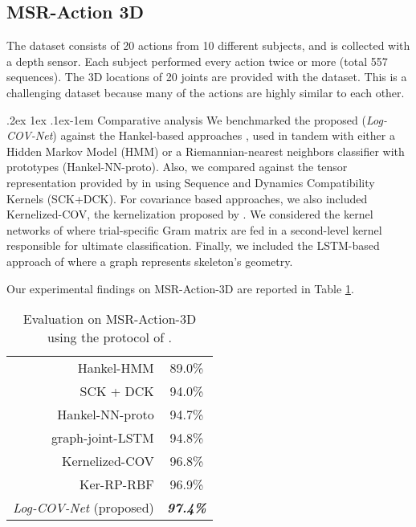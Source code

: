 \documentclass[10pt,twocolumn]{article}
\makeatletter
\renewcommand{\paragraph}{%
	\@startsection{paragraph}{4}%
	{\z@}{.2ex \@plus 1ex \@minus .1ex}{-1em}%
	{\normalfont\normalsize\bfseries}%
}
\makeatother
\begin{document}
\subsection{MSR-Action 3D} The dataset consists of 20 actions
from 10 different subjects, and is collected with a depth sensor. Each subject performed every action twice or more (total 557 sequences). The 3D locations of 20 joints are provided with the dataset. This is a challenging dataset because many of the actions are highly similar to each other.

\paragraph{Comparative analysis} We benchmarked the proposed (\textit{Log-COV-Net}) against the Hankel-based approaches \cite{Camps:ACCV14,Camps:CVPR16}, used in tandem with either a Hidden Markov Model (HMM) or a Riemannian-nearest neighbors classifier with prototypes (Hankel-NN-proto). Also, we compared against the tensor representation provided by \cite{ECCV16} in using Sequence and Dynamics Compatibility Kernels (SCK+DCK). For covariance based approaches, we also included Kernelized-COV, the kernelization proposed by \cite{Cavazza:ICPR16}. We considered the kernel networks of \cite{Wang:ICCV15} where trial-specific Gram matrix are fed in a second-level kernel responsible for ultimate classification. Finally, we included the LSTM-based approach of \cite{Liu:ECCV16} where a graph represents skeleton's geometry. 

Our experimental findings on MSR-Action-3D are reported in Table \ref{tab:MSRA}.

\begin{table}[h!]
	\centering
\begin{tabular}{|rc|}
	\hline
	Hankel-HMM \cite{Camps:ACCV14} & 89.0\% \\
	SCK + DCK \cite{ECCV16} & 94.0\% \\
	Hankel-NN-proto \cite{Camps:CVPR16} & 94.7\% \\
	graph-joint-LSTM \cite{Liu:ECCV16} & 94.8\% \\
	Kernelized-COV \cite{Cavazza:ICPR16} & 96.8\% \\ 
	Ker-RP-RBF \cite{Wang:ICCV15} & 96.9\% \\ \hline \hline
	\textit{Log-COV-Net} (proposed) & \textbf{\textit{97.4\%}} \\ \hline
\end{tabular}
\caption{Evaluation on MSR-Action-3D using the protocol of \cite{Action3D}.}
\label{tab:MSRA}
\end{table}
\end{document}
